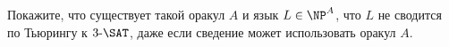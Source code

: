 Покажите, что существует такой оракул $A$ и язык $L \in \NP^A$, что $L$ не сводится по Тьюрингу к $3\text{-}\SAT$, даже если
сведение может использовать оракул $A$.
